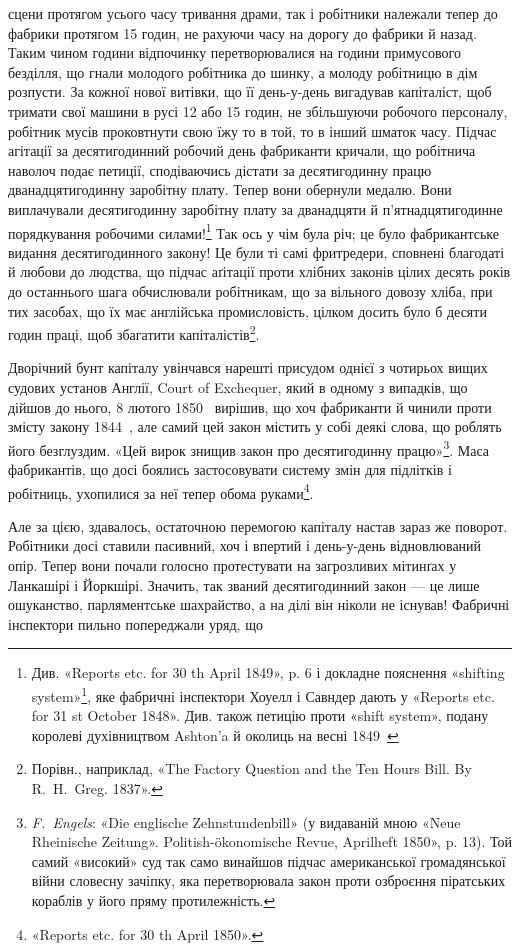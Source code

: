 \parcont{}  %
сцени протягом усього часу тривання драми, так і робітники належали
тепер до фабрики протягом 15 годин, не рахуючи часу на
дорогу до фабрики й назад. Таким чином години відпочинку перетворювалися
на години примусового безділля, що гнали молодого
робітника до шинку, а молоду робітницю в дім розпусти. За
кожної нової витівки, що її день-у-день вигадував капіталіст,
щоб тримати свої машини в русі 12 або 15 годин, не збільшуючи
робочого персоналу, робітник мусів проковтнути свою їжу то в
той, то в інший шматок часу. Підчас агітації за десятигодинний
робочий день фабриканти кричали, що робітнича наволоч подає
петиції, сподіваючись дістати за десятигодинну працю дванадцятигодинну
заробітну плату. Тепер вони обернули медалю. Вони
виплачували десятигодинну заробітну плату за дванадцяти й
п’ятнадцятигодинне порядкування робочими силами!\footnote{
Див. «Reports etc. for 30 th April 1849», p. 6 і докладне пояснення
«shifting system»\footnote*{
системи пересувань. 
}, яке фабричні інспектори Хоуелл і Савндер дають
у «Reports etc. for 31 st October 1848». Див. також петицію проти
«shift system», подану королеві духівництвом Ashton’a й околиць на весні
1849~
} Так ось
у чім була річ; це було фабрикантське видання десятигодинного
закону! Це були ті самі фритредери, сповнені благодаті й любови
до людства, що підчас аґітації проти хлібних законів цілих десять
років до останнього шага обчислювали робітникам, що за вільного
довозу хліба, при тих засобах, що їх має англійська промисловість,
цілком досить було б десяти годин праці, щоб збагатити
капіталістів\footnote{
Порівн., наприклад, «The Factory Question and the Ten Hours
Bill. By R.~H.~Greg. 1837».
}.

Дворічний бунт капіталу увінчався нарешті присудом однієї
з чотирьох вищих судових установ Англії, Court of Exchequer,
який в одному з випадків, що дійшов до нього, 8 лютого 1850~
вирішив, що хоч фабриканти й чинили проти змісту закону
1844~, але самий цей закон містить у собі деякі слова, що роблять
його безглуздим. «Цей вирок знищив закон про десятигодинну
працю»\footnote{
\emph{F.~Engels}: «Die englische Zehnstundenbill» (у видаваній мною
«Neue Rheinische Zeitung». Politish-ökonomische Revue, Aprilheft
1850», p. 13). Той самий «високий» суд так само винайшов підчас американської
громадянської війни словесну зачіпку, яка перетворювала закон
проти озброєння піратських кораблів у його пряму протилежність.
}. Маса фабрикантів, що досі боялись застосовувати
систему змін для підлітків і робітниць, ухопилися за неї тепер
обома руками\footnote{
«Reports etc. for 30 th April 1850».
}.

Але за цією, здавалось, остаточною перемогою капіталу
настав зараз же поворот. Робітники досі ставили пасивний, хоч
і впертий і день-у-день відновлюваний опір. Тепер вони почали
голосно протестувати на загрозливих мітинґах у Ланкашірі і
Йоркшірі. Значить, так званий десятигодинний закон — це лише
ошуканство, парляментське шахрайство, а на ділі він ніколи не
існував! Фабричні інспектори пильно попереджали уряд, що
\parbreak{}  %
